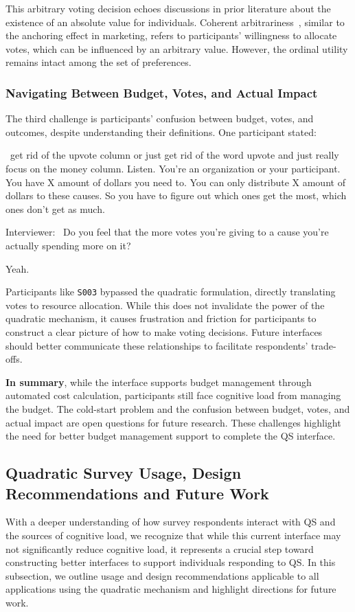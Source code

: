 This arbitrary voting decision echoes discussions in prior literature about the existence of an absolute value for individuals. Coherent arbitrariness~\cite{arielyCoherentArbitrarinessStable2003}, similar to the anchoring effect in marketing, refers to participants' willingness to allocate votes, which can be influenced by an arbitrary value. However, the ordinal utility remains intact among the set of preferences.

\subsubsection{Navigating Between Budget, Votes, and Actual Impact}
The third challenge is participants' confusion between budget, votes, and outcomes, despite understanding their definitions. One participant stated:

\begin{displayquote}

~\bracketellipsis get rid of the upvote column or just get rid of the word upvote and just really focus on the money column. Listen. You're an organization or your participant. You have X amount of dollars you need to. You can only distribute X amount of dollars to these causes. So you have to figure out which ones get the most, which ones don't get as much.~\bracketellipsis 

Interviewer: ~\bracketellipsis Do you feel that the more votes you're giving to a cause you're actually spending more on it?

Yeah. \hfill{}
\end{displayquote}

Participants like \texttt{S003} bypassed the quadratic formulation, directly translating votes to resource allocation. While this does not invalidate the power of the quadratic mechanism, it causes frustration and friction for participants to construct a clear picture of how to make voting decisions. Future interfaces should better communicate these relationships to facilitate respondents' trade-offs.

\textbf{In summary}, while the interface supports budget management through automated cost calculation, participants still face cognitive load from managing the budget. The cold-start problem and the confusion between budget, votes, and actual impact are open questions for future research. These challenges highlight the need for better budget management support to complete the QS interface.

\subsection{Quadratic Survey Usage, Design Recommendations and Future Work}
With a deeper understanding of how survey respondents interact with QS and the sources of cognitive load, we recognize that while this current interface may not significantly reduce cognitive load, it represents a crucial step toward constructing better interfaces to support individuals responding to QS. In this subsection, we outline usage and design recommendations applicable to all applications using the quadratic mechanism and highlight directions for future work.

